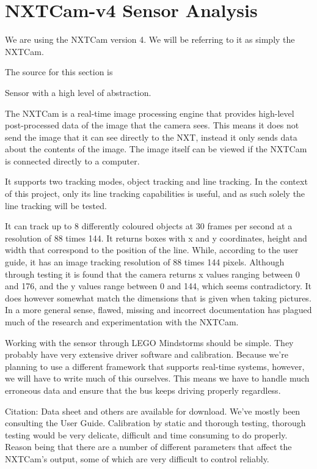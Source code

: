 \section{NXTCam-v4 Sensor Analysis}\label{CamAnalysis}



We are using the NXTCam version 4. We will be referring to it as simply the NXTCam.

The source for this section is \cite{NXTCamUserGuide}

Sensor with a high level of abstraction.

The NXTCam is a real-time image processing engine that provides high-level post-processed data of the image that the camera sees. This means it does not send the image that it can see directly to the NXT, instead it only sends data about the contents of the image. The image itself can be viewed if the NXTCam is connected directly to a computer. 

It supports two tracking modes, object tracking and line tracking.
In the context of this project, only its line tracking capabilities is useful, and as such solely the line tracking will be tested.

It can track up to 8 differently coloured objects at 30 frames per second at a resolution of 88 times 144. It returns boxes with x and y coordinates, height and width that correspond to the position of the line. While, according to the user guide, it has an image tracking resolution of 88 times 144 pixels. Although through testing it is found that the camera returns x values ranging between 0 and 176, and the y values range between 0 and 144, which seems contradictory. It does however somewhat match the dimensions that is given when taking pictures. In a more general sense, flawed, missing and incorrect documentation has plagued much of the research and experimentation with the NXTCam. 


Working with the sensor through LEGO Mindstorms should be simple. They probably have very extensive driver software and calibration. Because we're planning to use a different framework that supports real-time systems, however, we will have to write much of this ourselves. This means we have to handle much erroneous data and ensure that the bus keeps driving properly regardless. 

Citation: \cite{nxtCamDocumentation}
Data sheet and others are available for download. We've mostly been consulting the User Guide. 
Calibration by static and thorough testing, thorough testing would be very delicate, difficult and time consuming to do properly. Reason being that there are a number of different parameters that affect the NXTCam's output, some of which are very difficult to control reliably. 

